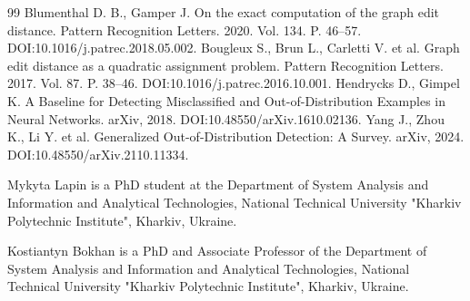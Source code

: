 \documentclass[conference]{IEEEtran}
\begin{document}
\begin{thebibliography}{99}
 Blumenthal D. B., Gamper J. On the exact computation of the graph edit distance. Pattern Recognition Letters. 2020. Vol. 134. P. 46--57. DOI:10.1016/j.patrec.2018.05.002.
 Bougleux S., Brun L., Carletti V. et al. Graph edit distance as a quadratic assignment problem. Pattern Recognition Letters. 2017. Vol. 87. P. 38--46. DOI:10.1016/j.patrec.2016.10.001.
 Hendrycks D., Gimpel K. A Baseline for Detecting Misclassified and Out-of-Distribution Examples in Neural Networks. arXiv, 2018. DOI:10.48550/arXiv.1610.02136.
 Yang J., Zhou K., Li Y. et al. Generalized Out-of-Distribution Detection: A Survey. arXiv, 2024. DOI:10.48550/arXiv.2110.11334.

\end{thebibliography}

\begin{IEEEbiographynophoto}{Mykyta Lapin}
is a PhD student at the Department of System Analysis and Information and Analytical Technologies, National Technical University "Kharkiv Polytechnic Institute", Kharkiv, Ukraine.
\end{IEEEbiographynophoto}

\begin{IEEEbiographynophoto}{Kostiantyn Bokhan}
is a PhD and Associate Professor of the Department of System Analysis and Information and Analytical Technologies, National Technical University "Kharkiv Polytechnic Institute", Kharkiv, Ukraine.
\end{IEEEbiographynophoto}
\end{document}
